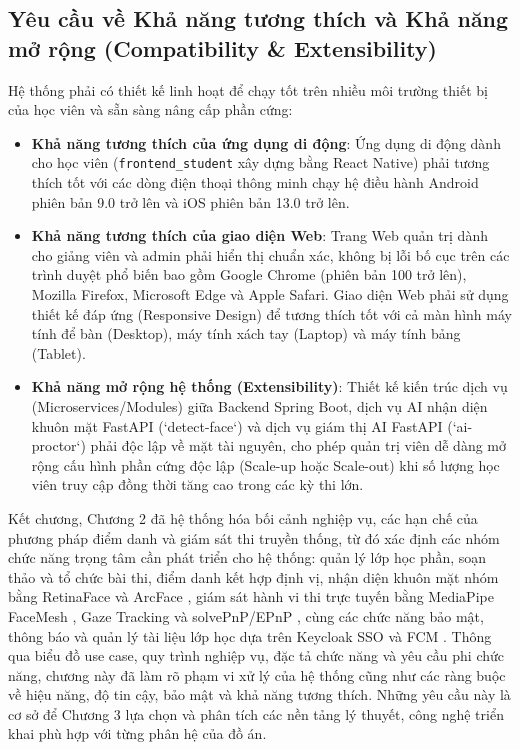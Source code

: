\documentclass[../DoAn.tex]{subfiles}
\begin{document}
\subsection{Yêu cầu về Khả năng tương thích và Khả năng mở rộng (Compatibility \& Extensibility)}
Hệ thống phải có thiết kế linh hoạt để chạy tốt trên nhiều môi trường thiết bị của học viên và sẵn sàng nâng cấp phần cứng:
\begin{itemize}
    \item \textbf{Khả năng tương thích của ứng dụng di động}: Ứng dụng di động dành cho học viên (\mbox{\texttt{frontend\_student}} xây dựng bằng React Native) phải tương thích tốt với các dòng điện thoại thông minh chạy hệ điều hành Android phiên bản 9.0 trở lên và iOS phiên bản 13.0 trở lên.
    \item \textbf{Khả năng tương thích của giao diện Web}: Trang Web quản trị dành cho giảng viên và admin phải hiển thị chuẩn xác, không bị lỗi bố cục trên các trình duyệt phổ biến bao gồm Google Chrome (phiên bản 100 trở lên), Mozilla Firefox, Microsoft Edge và Apple Safari. Giao diện Web phải sử dụng thiết kế đáp ứng (Responsive Design) để tương thích tốt với cả màn hình máy tính để bàn (Desktop), máy tính xách tay (Laptop) và máy tính bảng (Tablet).
    \item \textbf{Khả năng mở rộng hệ thống (Extensibility)}: Thiết kế kiến trúc dịch vụ (Microservices/Modules) giữa Backend Spring Boot, dịch vụ AI nhận diện khuôn mặt FastAPI (`detect-face`) và dịch vụ giám thị AI FastAPI (`ai-proctor`) phải độc lập về mặt tài nguyên, cho phép quản trị viên dễ dàng mở rộng cấu hình phần cứng độc lập (Scale-up hoặc Scale-out) khi số lượng học viên truy cập đồng thời tăng cao trong các kỳ thi lớn.
\end{itemize}
\fi

Kết chương, Chương 2 đã hệ thống hóa bối cảnh nghiệp vụ, các hạn chế của phương pháp điểm danh và giám sát thi truyền thống, từ đó xác định các nhóm chức năng trọng tâm cần phát triển cho hệ thống: quản lý lớp học phần, soạn thảo và tổ chức bài thi, điểm danh kết hợp định vị, nhận diện khuôn mặt nhóm bằng RetinaFace \cite{Deng_2020_CVPR} và ArcFace \cite{Deng_2019_CVPR}, giám sát hành vi thi trực tuyến bằng MediaPipe FaceMesh \cite{Lugaresi2019MediaPipe}, Gaze Tracking \cite{kaundinya2026inbrowser} và solvePnP/EPnP \cite{Lepetit2009EPnP}, cùng các chức năng bảo mật, thông báo và quản lý tài liệu lớp học dựa trên Keycloak SSO \cite{keycloak2026} và FCM \cite{fcm2026}. Thông qua biểu đồ use case, quy trình nghiệp vụ, đặc tả chức năng và yêu cầu phi chức năng, chương này đã làm rõ phạm vi xử lý của hệ thống cũng như các ràng buộc về hiệu năng, độ tin cậy, bảo mật và khả năng tương thích. Những yêu cầu này là cơ sở để Chương 3 lựa chọn và phân tích các nền tảng lý thuyết, công nghệ triển khai phù hợp với từng phân hệ của đồ án.
\end{document}
